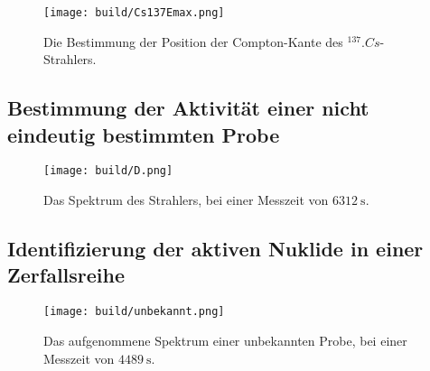 \begin{figure}
	\centering
	\texttt{[image: build/Cs137Emax.png]}
	\caption{Die Bestimmung der Position der Compton-Kante des $^{137}.{Cs}$-Strahlers.}
	\label{fig:Emax}
\end{figure}

%	

\subsection{Bestimmung der Aktivität einer nicht eindeutig bestimmten Probe}

\begin{figure}
	\centering
	\texttt{[image: build/D.png]}
	\caption{Das Spektrum des Strahlers, bei einer Messzeit von $\SI{6312}{\second}$.}
	\label{fig:Ba}
\end{figure}

%	

%	

\subsection{Identifizierung der aktiven Nuklide in einer Zerfallsreihe}

\begin{figure}
	\centering
	\texttt{[image: build/unbekannt.png]}
	\caption{Das aufgenommene Spektrum einer unbekannten Probe, bei einer Messzeit von $\SI{4489}{\second}$.}
	\label{fig:SpektrumUnbekannt}
\end{figure}

